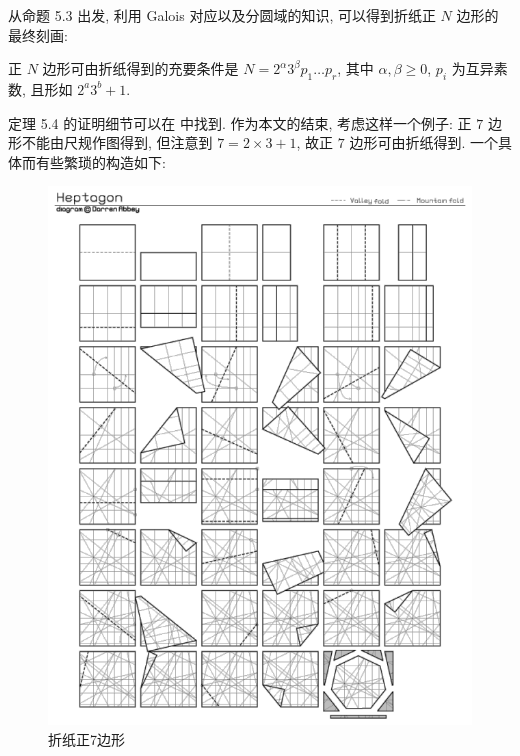 从命题 5.3 出发, 利用 Galois 对应以及分圆域的知识, 可以得到折纸正 $N$ 边形的最终刻画: 

\begin{theorem}
    正 $N$ 边形可由折纸得到的充要条件是 $N=2^\alpha 3^\beta p_1\dots p_r$,
     其中 $\alpha,\beta\geq 0$, $p_i$ 为互异素数, 且形如 $2^a3^b+1$.
\end{theorem}

定理 5.4 的证明细节可以在 \cite{Vid}中找到.
作为本文的结束, 考虑这样一个例子: 正 $7$ 边形不能由尺规作图得到, 
但注意到 $7=2\times 3+1$, 故正 $7$ 边形可由折纸得到. 
一个具体而有些繁琐的构造如下: 

\begin{figure}[h]
    \centering
    \includegraphics[scale=0.5]{7-gons.png}
    \caption{折纸正7边形}
\end{figure}
